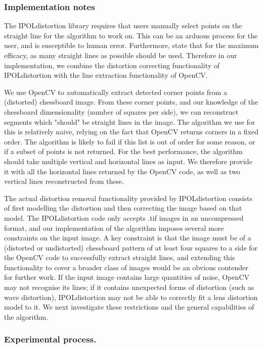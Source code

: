 \subsubsection{Implementation notes}

The IPOLdistortion library requires that users manually select points on the straight line for the algorithm to work on. This can be an arduous process for the user, and is susceptible to human error. Furthermore, \cite{algebraic-distortion} state that for the maximum efficacy, as many straight lines as possible should be used. Therefore in our implementation, we combine the distortion correcting functionality of IPOLdistortion with the line extraction functionality of OpenCV. 

We use OpenCV to automatically extract detected corner points from a (distorted) chessboard image. From these corner points, and our knowledge of the chessboard dimensionality (number of squares per side), we can reconstruct segments which "should" be straight lines in the image. The algorithm we use for this is relatively naive, relying on the fact that OpenCV returns corners in a fixed order. The algorithm is likely to fail if this list is out of order for some reason, or if a subset of points is not returned. For the best performance, the algorithm should take multiple vertical and horizontal lines as input. We therefore provide it with all the horizontal lines returned by the OpenCV code, as well as two vertical lines reconstructed from these.

The actual distortion removal functionality provided by IPOLdistortion consists of first modelling the distortion and then correcting the image based on that model. The IPOLdistortion code only accepts .tif images in an uncompressed format, and our implementation of the algorithm imposes several more constraints on the input image. A key constraint is that the image must be of a (distorted or undistorted) chessboard pattern of at least four squares to a side for the OpenCV code to successfully extract straight lines, and extending this functionality to cover a broader class of images would be an obvious contender for further work. If the input image contains large quantities of noise, OpenCV may not recognise its lines; if it contains unexpected forms of distortion (such as wave distortion), IPOLdistortion may not be able to correctly fit a lens distortion model to it. We next investigate these restrictions and the general capabilities of the algorithm.

\subsubsection{Experimental process.}

